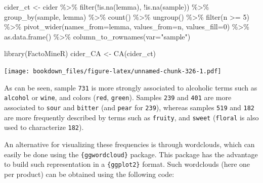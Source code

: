 \documentclass[
]{krantz}
\makeatletter
\newenvironment{Shaded}{\begin{snugshade}}{\end{snugshade}}
\newcommand{\AttributeTok}[1]{\textcolor[rgb]{0.61,0.61,0.61}{#1}}
\newcommand{\DecValTok}[1]{\textcolor[rgb]{0.06,0.06,0.06}{#1}}
\newcommand{\FunctionTok}[1]{\textcolor[rgb]{0,0,0}{#1}}
\newcommand{\NormalTok}[1]{#1}
\newcommand{\OtherTok}[1]{\textcolor[rgb]{0.37,0.37,0.37}{#1}}
\newcommand{\SpecialCharTok}[1]{\textcolor[rgb]{0,0,0}{#1}}
\newcommand{\StringTok}[1]{\textcolor[rgb]{0.5,0.5,0.5}{#1}}
\newenvironment{kframe}{%
\medskip{}
\setlength{\fboxsep}{.8em}
 \def\at@end@of@kframe{}%
 \ifinner\ifhmode%
  \def\at@end@of@kframe{\end{minipage}}%
  \begin{minipage}{\columnwidth}%
 \fi\fi%
 \def\FrameCommand##1{\hskip\@totalleftmargin \hskip-\fboxsep
 \colorbox{shadecolor}{##1}\hskip-\fboxsep
     \hskip-\linewidth \hskip-\@totalleftmargin \hskip\columnwidth}%
 \MakeFramed {\advance\hsize-\width
   \@totalleftmargin\z@ \linewidth\hsize
   \@setminipage}}%
 {\par\unskip\endMakeFramed%
 \at@end@of@kframe}
\renewenvironment{Shaded}{\begin{kframe}}{\end{kframe}}
\makeatother
\begin{document}
\begin{Shaded}
\begin{Highlighting}[]
\NormalTok{cider\_ct }\OtherTok{\textless{}{-}}\NormalTok{ cider }\SpecialCharTok{\%\textgreater{}\%} 
  \FunctionTok{filter}\NormalTok{(}\SpecialCharTok{!}\FunctionTok{is.na}\NormalTok{(lemma), }\SpecialCharTok{!}\FunctionTok{is.na}\NormalTok{(sample)) }\SpecialCharTok{\%\textgreater{}\%} 
  \FunctionTok{group\_by}\NormalTok{(sample, lemma) }\SpecialCharTok{\%\textgreater{}\%} 
  \FunctionTok{count}\NormalTok{() }\SpecialCharTok{\%\textgreater{}\%} 
  \FunctionTok{ungroup}\NormalTok{() }\SpecialCharTok{\%\textgreater{}\%} 
  \FunctionTok{filter}\NormalTok{(n }\SpecialCharTok{\textgreater{}=} \DecValTok{5}\NormalTok{) }\SpecialCharTok{\%\textgreater{}\%} 
  \FunctionTok{pivot\_wider}\NormalTok{(}\AttributeTok{names\_from=}\NormalTok{lemma, }\AttributeTok{values\_from=}\NormalTok{n, }\AttributeTok{values\_fill=}\DecValTok{0}\NormalTok{) }\SpecialCharTok{\%\textgreater{}\%} 
  \FunctionTok{as.data.frame}\NormalTok{() }\SpecialCharTok{\%\textgreater{}\%} 
  \FunctionTok{column\_to\_rownames}\NormalTok{(}\AttributeTok{var=}\StringTok{"sample"}\NormalTok{)}

\FunctionTok{library}\NormalTok{(FactoMineR)}
\NormalTok{cider\_CA }\OtherTok{\textless{}{-}} \FunctionTok{CA}\NormalTok{(cider\_ct)}
\end{Highlighting}
\end{Shaded}

\texttt{[image: bookdown\_files/figure-latex/unnamed-chunk-326-1.pdf]}

As can be seen, sample \texttt{731} is more strongly associated to alcoholic terms such as \texttt{alcohol} or \texttt{wine}, and colors (\texttt{red}, \texttt{green}). Samples \texttt{239} and \texttt{401} are more associated to \texttt{sour} and \texttt{bitter} (and \texttt{pear} for \texttt{239}), whereas samples \texttt{519} and \texttt{182} are more frequently described by terms such as \texttt{fruity}, and \texttt{sweet} (\texttt{floral} is also used to characterize \texttt{182}).

An alternative for visualizing these frequencies is through wordclouds, which can easily be done using the \texttt{\{ggwordcloud\}} package. This package has the advantage to build such representation in a \texttt{\{ggplot2\}} format. Such wordclouds (here one per product) can be obtained using the following code:
\end{document}
